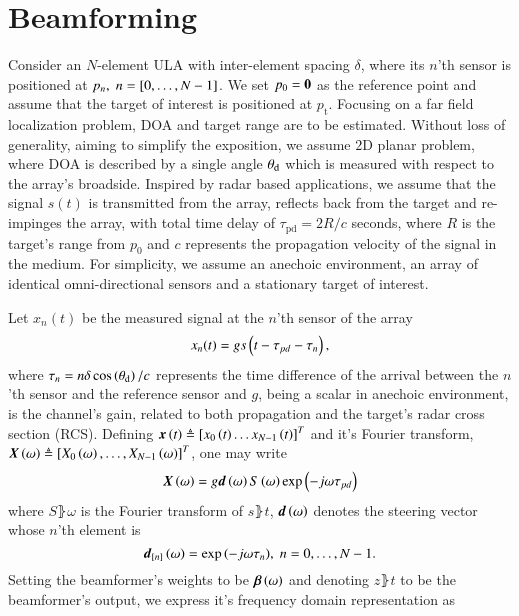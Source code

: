 \section{Beamforming}\label{sec:setup}
Consider an $N$-element ULA with inter-element spacing $\delta$, where its $n$'th sensor is positioned at $p_{n},\; n=\left[{0,\ldots,N-1}\right]$. We set $p_{0}=\boldsymbol{0}$ as the reference point and assume that the target of interest is positioned at $p_{\text{t}}$.
Focusing on a far field localization problem, DOA and target range are to be estimated. Without loss of generality, aiming to simplify the exposition, we assume $2\text{D}$ planar problem, where DOA is described by a single angle $\theta_{\text{d}}$ which is measured with respect to the array's broadside.
Inspired by radar based applications, we assume that the signal $s(t)$ is transmitted from the array, reflects back from the target and re-impinges the array, with total time delay of $\tau_{\text{pd}}=2R/c$ seconds, where $R$ is the target's range from $p_{0}$ and $c$ represents the propagation velocity of the signal in the medium. 
For simplicity, we assume an anechoic environment, an array of identical omni-directional sensors and a stationary target of interest.
\par Let $x_{n}(t)$ be the measured signal at the $n$'th sensor of the array
\begin{equation}
x_{n}(t) = gs\Brack{t-\tau_{pd}-\tau_{n}},
\label{eqn:noFeedbackULA_singleSensor_temporal}
\end{equation}
where $\tau_{n}=n\delta\cos\left({\theta_{\text{d}}}\right)/c$ represents the time difference of the arrival between the $n$'th sensor and the reference sensor and $g$, being a scalar in anechoic environment, is the channel's gain, related to both propagation and the target's radar cross section (RCS).
Defining $\boldsymbol{x}\left({t}\right)\triangleq\left[{x_{0}\left({t}\right)\hdots{}x_{N-1}\left({t}\right)}\right]^{T}$ and it's Fourier transform, $\vecnot{\F{x}}\rBrace{\omega}\triangleq\vBrace{X_{0}\rBrace{\omega},\hdots,X_{N-1}\rBrace{\omega}}^{T}$, one may write 
\[
\vecnot{\F{x}}\rBrace{\omega}=g\vecnot{d}\rBrace{\omega}\F{s}\rBrace{\omega}\exp{\rBrace{-j\omega\tau_{pd}}}
\]
where $S\rBrace{\omega}$ is the Fourier transform of $s\rBrace{t}$, $\boldsymbol{d}\left({\omega}\right)$ denotes the steering vector whose $n$'th element is
\begin{equation}
    \label{eq:d}
    \vecnot{d}_{\vBrace{n}}\rBrace{\omega} = \exp{\rBrace{-j\omega\tau_{n}}},\;n=0,\ldots,N-1.
\end{equation}
Setting the beamformer's weights to be $\vBeta\rBrace{\omega}$ and denoting $z\rBrace{t}$ to be the beamformer's output, we express it's frequency domain representation as
